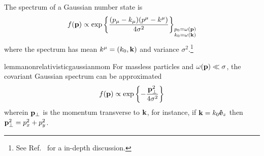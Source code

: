\begin{definition}
	The spectrum of a Gaussian number state is
	\begin{equation}
		f(\vb{p})
		\propto
		\exp\left\{
			\frac{(p_\mu-k_\mu)(p^\mu-k^\mu)}{4\sigma^2}
		\right\}_{\substack{p_0=\omega(\vb{p})\\k_0=\omega(\vb{k})}}
		\label{eq:covariant_gaussian_spectrum}
	\end{equation}
	where the spectrum has mean $k^\mu=(k_0,\vb{k})$ and variance $\sigma^2$.\footnote{See Ref.~\cite{Naumov2013,Naumov2009} for a in-depth discussion.}
\end{definition}
\begin{restatable}{lemma}{nonrelativisticgaussianmom}\label{thm:non_relativistic_gaussian_momentum}
	For massless particles and $\omega(\vb{p})\ll\sigma$, the covariant Gaussian spectrum can be approximated
	\begin{equation}
		f(\vb{p})
		\propto
		\exp\left\{
			-
			\frac{
				\vb{p}_\perp^2
			}{4\sigma^2}
		\right\}
	\end{equation}
	wherein $\vb{p}_\perp$ is the momentum transverse to $\vb{k}$, for instance, if $\vb{k}=k_0\vu{e}_z$ then $\vb{p}_\perp^2=p_x^2+p_y^2$.
\end{restatable}

